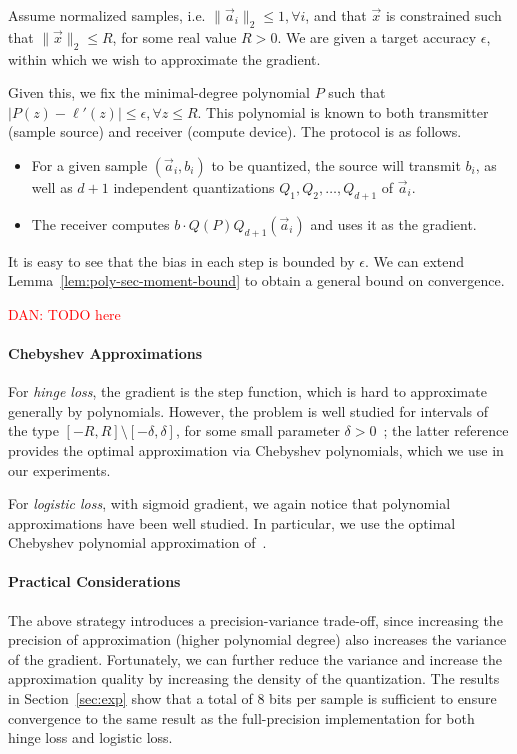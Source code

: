 Assume normalized samples, i.e. $\| \vec{a}_i \|_2 \leq 1, \forall i$, and that $\vec{x}$ is constrained such that $\| \vec{x} \|_2 \leq R$, for some real value $R > 0$. We are given a target accuracy $\epsilon$, within which we wish to approximate the gradient. 

Given this, we fix the minimal-degree polynomial $P$ such that $|P(z) - \ell'(z)| \leq \epsilon, \forall z \leq R$. This polynomial is known to both transmitter (sample source) and receiver (compute device). The protocol is as follows. 
\begin{itemize}
	\item For a given sample $(\vec{a}_i, b_i)$ to be quantized, the source will transmit $b_i$, as well as $d + 1$ independent quantizations $Q_1, Q_2, \ldots, Q_{d + 1}$ of $\vec{a}_i$. 
	\item The receiver computes $b \cdot Q(P) Q_{d + 1} ( \vec{a}_i )$ and uses it as the gradient.
\end{itemize}

It is easy to see that the bias in each step is bounded by $\epsilon$. 
We can extend Lemma~\ref{lem:poly-sec-moment-bound} to obtain a general bound on convergence. 

\begin{lemma}
	\textcolor{red}{DAN: TODO here}
\end{lemma}

\paragraph{Chebyshev Approximations} 
For \emph{hinge loss}, the gradient is the step function, which is hard to approximate generally by polynomials. 
However, the problem is well studied for intervals of the type  $[-R, R] \setminus [-\delta, \delta]$, for some small parameter $\delta > 0$~\cite{frostig2016principal, allen2016faster}; the latter reference provides the optimal approximation via Chebyshev polynomials, which we use in our experiments. 

For \emph{logistic loss}, with sigmoid gradient, we again notice that polynomial approximations have been well studied. In particular, we use the optimal Chebyshev polynomial approximation of~\cite{vlcek2012chebyshev}. 

\paragraph{Practical Considerations} The above strategy introduces a precision-variance trade-off, since increasing the precision of approximation (higher polynomial degree) also increases the variance of the gradient. 
Fortunately, we can further reduce the variance and increase the approximation quality by increasing the density of the quantization. 
The results in Section~\ref{sec:exp} show that a total of $8$ bits per sample is sufficient to ensure convergence to the same result as the full-precision 
implementation for both hinge loss and logistic loss. 


